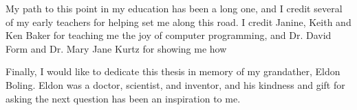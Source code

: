 My path to this point in my education has been a long one, and I credit several of my early teachers for helping set me along this road.
I credit Janine, Keith and Ken Baker for teaching me the joy of computer programming, and Dr. David Form and Dr. Mary Jane Kurtz for showing me how %


Finally, I would like to dedicate this thesis in memory of my grandather, Eldon Boling.
Eldon was a doctor, scientist, and inventor, and his kindness and gift for asking the next question has been an inspiration to me. 
